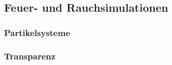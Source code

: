 \subsection{Feuer- und Rauchsimulationen}
\subsubsection{Partikelsysteme}
\subsubsection{Transparenz}